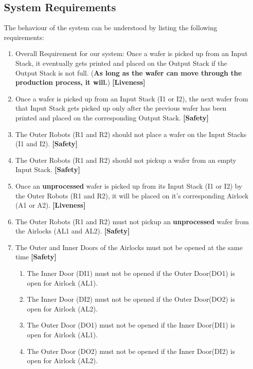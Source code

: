 \documentclass[a4paper,12pt]{article}
\begin{document}
	
	\subsection{System Requirements}
	The behaviour of the system can be understood by listing the following requirements:
	
	\begin{enumerate}
		\item Overall Requirement for our system: Once a wafer is picked up from an Input Stack, it eventually gets printed and placed on the Output Stack if the Output Stack is not full. (\textbf{As long as the wafer can move through the production process, it will.}) \textbf{[Liveness]}
		\item Once a wafer is picked up from an Input Stack (I1 or I2), the next wafer from that Input Stack gets picked up only after the previous wafer has been printed and placed on the corresponding Output Stack. \textbf{[Safety]}
		\item The Outer Robots (R1 and R2) should not place a wafer on the Input Stacks (I1 and I2). \textbf{[Safety]}
		\item The Outer Robots (R1 and R2) should not pickup a wafer from an empty Input Stack. \textbf{[Safety]}
		\item Once an \textbf{unprocessed} wafer is picked up from its Input Stack (I1 or I2) by the Outer Robots (R1 and R2), it will be placed on it's corresponding Airlock (A1 or A2). \textbf{[Liveness]}
		\item The Outer Robots (R1 and R2) must not pickup an \textbf{unprocessed} wafer from the Airlocks (AL1 and AL2). \textbf{[Safety]}
		\item The Outer and Inner Doors of the Airlocks must not be opened at the same time \textbf{[Safety]}
		\begin{enumerate}
			\item The Inner Door (DI1) must not be opened if the Outer Door(DO1) is open for Airlock (AL1).
			
			\item The Inner Door (DI2) must not be opened if the Outer Door(DO2) is open for Airlock (AL2).
			
			\item The Outer Door (DO1) must not be opened if the Inner Door(DI1) is open for Airlock (AL1).
			
			\item The Outer Door (DO2) must not be opened if the Inner Door(DI2) is open for Airlock (AL2).
			

\end{enumerate}
\end{enumerate}
\end{document}
